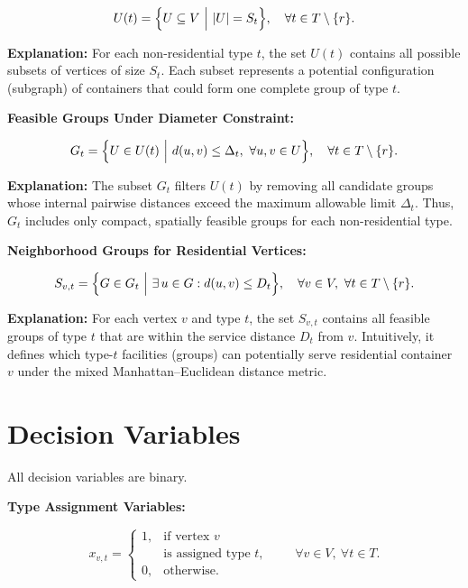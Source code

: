 \documentclass[12pt,a4paper]{article}
\begin{document}
\[
U(t) = 
\Bigl\{
    U \subseteq V \ \Big| \ |U| = S_t
\Bigr\},
\quad \forall t \in T \setminus \{r\}.
\]

\textbf{Explanation:}  
For each non-residential type $t$, the set $U(t)$ contains all possible subsets of vertices of size $S_t$.  
Each subset represents a potential configuration (subgraph) of containers that could form one complete group of type $t$.

\vspace{1.5em}

\textbf{Feasible Groups Under Diameter Constraint:}

\[
G_t = 
\Bigl\{
    U \in U(t) \ \Big| \ 
    d(u,v) \le \Delta_t,\ 
    \forall u,v \in U
\Bigr\},
\quad \forall t \in T \setminus \{r\}.
\]

\textbf{Explanation:}  
The subset $G_t$ filters $U(t)$ by removing all candidate groups whose internal pairwise distances exceed the maximum allowable limit $\Delta_t$.  
Thus, $G_t$ includes only compact, spatially feasible groups for each non-residential type.

\vspace{1.5em}

\textbf{Neighborhood Groups for Residential Vertices:}

\[
S_{v,t} = 
\Bigl\{
    G \in G_t \ \Big| \ 
    \exists\, u \in G : d(u,v) \le D_t
\Bigr\},
\quad \forall v \in V, \ \forall t \in T \setminus \{r\}.
\]

\textbf{Explanation:}  
For each vertex $v$ and type $t$, the set $S_{v,t}$ contains all feasible groups of type $t$ that are within the service distance $D_t$ from $v$.  
Intuitively, it defines which type-$t$ facilities (groups) can potentially serve residential container $v$ under the mixed Manhattan–Euclidean distance metric.

\newpage

\newpage

\newpage
\section{Decision Variables}

All decision variables are binary.

\vspace{1em}

\textbf{Type Assignment Variables:}

\[
x_{v,t} =
\begin{cases}
1, & 
\text{if vertex } v \\ 
  & \text{is assigned type } t, \\[4pt]
0, & \text{otherwise.}
\end{cases}
\qquad 
\forall v \in V,\ 
\forall t \in T.
\]
\end{document}
